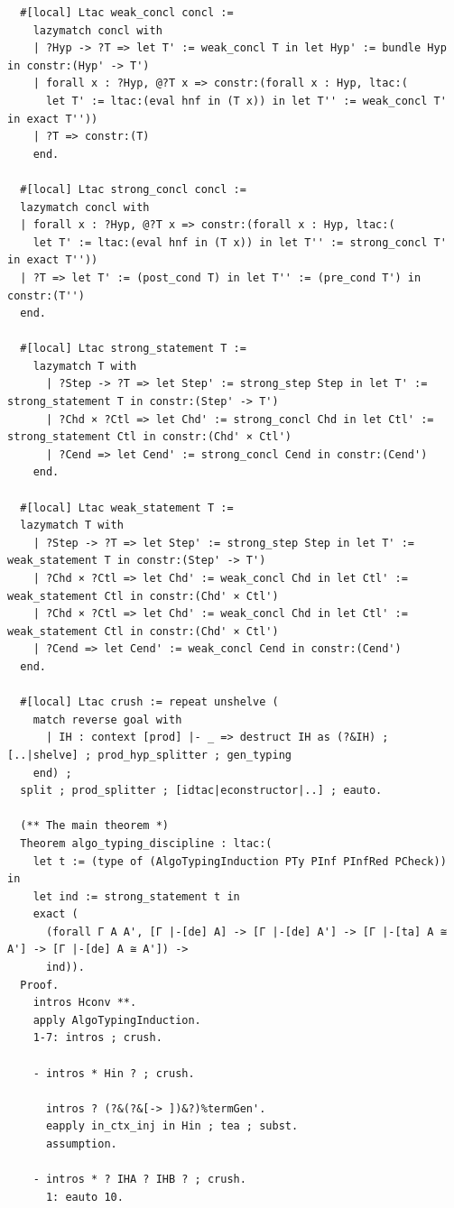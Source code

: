 \documentclass[10pt,a4paper]{amsart}
\begin{document}
\begin{lstlisting}
  #[local] Ltac weak_concl concl :=
    lazymatch concl with
    | ?Hyp -> ?T => let T' := weak_concl T in let Hyp' := bundle Hyp in constr:(Hyp' -> T')
    | forall x : ?Hyp, @?T x => constr:(forall x : Hyp, ltac:(
      let T' := ltac:(eval hnf in (T x)) in let T'' := weak_concl T' in exact T''))
    | ?T => constr:(T)
    end.

  #[local] Ltac strong_concl concl :=
  lazymatch concl with
  | forall x : ?Hyp, @?T x => constr:(forall x : Hyp, ltac:(
    let T' := ltac:(eval hnf in (T x)) in let T'' := strong_concl T' in exact T''))
  | ?T => let T' := (post_cond T) in let T'' := (pre_cond T') in constr:(T'')
  end.

  #[local] Ltac strong_statement T :=
    lazymatch T with
      | ?Step -> ?T => let Step' := strong_step Step in let T' := strong_statement T in constr:(Step' -> T')
      | ?Chd × ?Ctl => let Chd' := strong_concl Chd in let Ctl' := strong_statement Ctl in constr:(Chd' × Ctl')
      | ?Cend => let Cend' := strong_concl Cend in constr:(Cend')
    end.

  #[local] Ltac weak_statement T :=
  lazymatch T with
    | ?Step -> ?T => let Step' := strong_step Step in let T' := weak_statement T in constr:(Step' -> T')
    | ?Chd × ?Ctl => let Chd' := weak_concl Chd in let Ctl' := weak_statement Ctl in constr:(Chd' × Ctl')
    | ?Chd × ?Ctl => let Chd' := weak_concl Chd in let Ctl' := weak_statement Ctl in constr:(Chd' × Ctl')
    | ?Cend => let Cend' := weak_concl Cend in constr:(Cend')
  end.

  #[local] Ltac crush := repeat unshelve (
    match reverse goal with
      | IH : context [prod] |- _ => destruct IH as (?&IH) ; [..|shelve] ; prod_hyp_splitter ; gen_typing
    end) ;
  split ; prod_splitter ; [idtac|econstructor|..] ; eauto.

  (** The main theorem *)
  Theorem algo_typing_discipline : ltac:(
    let t := (type of (AlgoTypingInduction PTy PInf PInfRed PCheck)) in
    let ind := strong_statement t in
    exact (
      (forall Γ A A', [Γ |-[de] A] -> [Γ |-[de] A'] -> [Γ |-[ta] A ≅ A'] -> [Γ |-[de] A ≅ A']) ->
      ind)).
  Proof.
    intros Hconv **.
    apply AlgoTypingInduction.
    1-7: intros ; crush.

    - intros * Hin ? ; crush.

      intros ? (?&(?&[-> ])&?)%termGen'.
      eapply in_ctx_inj in Hin ; tea ; subst.
      assumption.

    - intros * ? IHA ? IHB ? ; crush.
      1: eauto 10.


\end{lstlisting}
\end{document}
